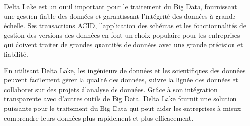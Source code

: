 Delta Lake est un outil important pour le traitement du Big Data, fournissant une gestion fiable des données et garantissant l'intégrité des données à grande échelle. Ses transactions ACID, l'application des schémas et les fonctionnalités de gestion des versions des données en font un choix populaire pour les entreprises qui doivent traiter de grandes quantités de données avec une grande précision et fiabilité.

En utilisant Delta Lake, les ingénieurs de données et les scientifiques des données peuvent facilement gérer la qualité des données, suivre la lignée des données et collaborer sur des projets d'analyse de données. Grâce à son intégration transparente avec d'autres outils de Big Data. Delta Lake fournit une solution puissante pour le traitement du Big Data qui peut aider les entreprises à mieux comprendre leurs données plus rapidement et plus efficacement.